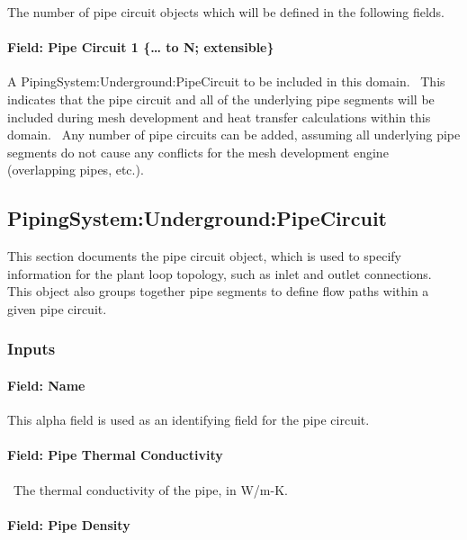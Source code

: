 The number of pipe circuit objects which will be defined in the following fields.

\paragraph{Field: Pipe Circuit 1 \{\ldots{} to N; extensible\}}\label{field-pipe-circuit-1-to-n-extensible}

A PipingSystem:Underground:PipeCircuit to be included in this domain.~ This indicates that the pipe circuit and all of the underlying pipe segments will be included during mesh development and heat transfer calculations within this domain.~ Any number of pipe circuits can be added, assuming all underlying pipe segments do not cause any conflicts for the mesh development engine (overlapping pipes, etc.).

\subsection{PipingSystem:Underground:PipeCircuit}\label{pipingsystemundergroundpipecircuit}

This section documents the pipe circuit object, which is used to specify information for the plant loop topology, such as inlet and outlet connections.~ This object also groups together pipe segments to define flow paths within a given pipe circuit.

\subsubsection{Inputs}\label{inputs-10-010}

\paragraph{Field: Name}\label{field-name-10-009}

This alpha field is used as an identifying field for the pipe circuit.

\paragraph{Field: Pipe Thermal Conductivity}\label{field-pipe-thermal-conductivity-001}

~The thermal conductivity of the pipe, in W/m-K.

\paragraph{Field: Pipe Density}\label{field-pipe-density-000}

